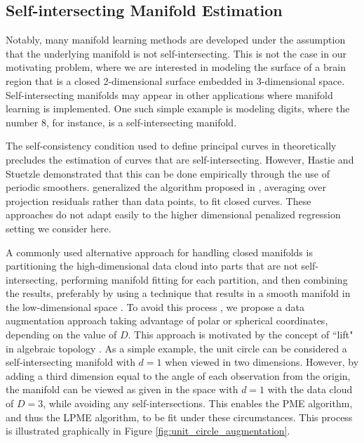 \documentclass[12pt]{article}
\theoremstyle{definition}
\begin{document}
\subsection{Self-intersecting Manifold Estimation}\label{ss:selfInt}

Notably, many manifold learning methods are developed under the assumption that the underlying manifold is not self-intersecting. This is not the case in our motivating problem, where we are interested in modeling the surface of a brain region that is a closed 2-dimensional surface embedded in 3-dimensional space. Self-intersecting manifolds may appear in other applications where manifold learning is implemented. One such simple example is modeling digits, where the number 8, for instance, is a self-intersecting manifold.

The self-consistency condition used to define principal curves in \cite{hastie1989Principal} theoretically precludes the estimation of curves that are self-intersecting. However, Hastie and Stuetzle demonstrated that this can be done empirically through the use of periodic smoothers. \cite{banfieldIceFloeIdentification1992} generalized the algorithm proposed in \cite{hastie1989Principal}, averaging over projection residuals rather than data points, to fit closed curves. These approaches do not adapt easily to the higher dimensional penalized regression setting we consider here.

A commonly used alternative approach for handling closed manifolds is partitioning the high-dimensional data cloud into parts that are not self-intersecting, performing manifold fitting for each partition, and then combining the results, preferably by using a technique that results in a smooth manifold in the low-dimensional space \citep[e.g.][]{meng2021Principal}. To avoid this process , we propose a data augmentation approach taking advantage of polar or spherical coordinates, depending on the value of $D$. This approach is motivated by the concept of ``lift" in algebraic topology \citep[sec. 1.1]{hatcher2002algebraic}. As a simple example, the unit circle can be considered a self-intersecting manifold with $d = 1$ when viewed in two dimensions. However, by adding a third dimension equal to the angle of each observation from the origin, the manifold can be viewed as given in the space with $d = 1$ with the data cloud of $D = 3$, while avoiding any self-intersections. This enables the PME algorithm, and thus the LPME algorithm, to be fit under these circumstances. This process is illustrated graphically in Figure \ref{fig:unit_circle_augmentation}.
\end{document}
